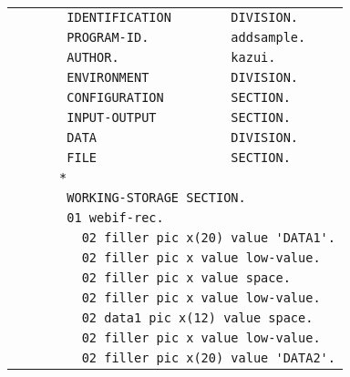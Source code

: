 {\footnotesize
\begin{tabular}{|l|}
\hline
\vspace{-0.4em}\verb!       IDENTIFICATION        DIVISION.!\\
\vspace{-0.4em}\verb!       PROGRAM-ID.           addsample.!\\
\vspace{-0.4em}\verb!       AUTHOR.               kazui.!\\
\vspace{-0.4em}\verb!       ENVIRONMENT           DIVISION.!\\
\vspace{-0.4em}\verb!       CONFIGURATION         SECTION.!\\
\vspace{-0.4em}\verb!       INPUT-OUTPUT          SECTION.!\\
\vspace{-0.4em}\verb!       DATA                  DIVISION.!\\
\vspace{-0.4em}\verb!       FILE                  SECTION.!\\
\vspace{-0.4em}\verb!      *!\\
\vspace{-0.4em}\verb!       WORKING-STORAGE SECTION.!\\
\vspace{-0.4em}\verb!       01 webif-rec.!\\
\vspace{-0.4em}\verb!         02 filler pic x(20) value 'DATA1'.!\\
\vspace{-0.4em}\verb!         02 filler pic x value low-value.!\\
\vspace{-0.4em}\verb!         02 filler pic x value space.!\\
\vspace{-0.4em}\verb!         02 filler pic x value low-value.!\\
\vspace{-0.4em}\verb!         02 data1 pic x(12) value space.!\\
\vspace{-0.4em}\verb!         02 filler pic x value low-value.!\\
\vspace{-0.4em}\verb!         02 filler pic x(20) value 'DATA2'.!\\

\end{tabular}}
